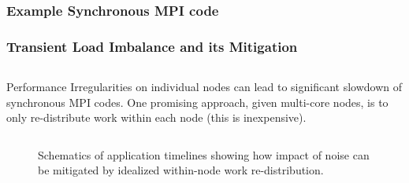 \begin{frame}
\frametitle{Example Synchronous MPI code}

\end{frame}


\begin{frame}
\frametitle{Transient Load Imbalance and its Mitigation}
\begin{columns} 
{\small Performance Irregularities on individual nodes can lead to
  significant slowdown of synchronous MPI codes. }
{\small One promising approach, given multi-core nodes, is to only
re-distribute work within each node (this is inexpensive). } 
\end{columns} 

\begin{figure}[ht]
  \label{fig:NoiseTransImbPic}
  \label{fig:AmplificationPic1}
  \label{fig:AmplificationPic3}\hspace*{0.25in}
  \caption{\label{fig:NoiseTransImbPic} Schematics of application
    timelines showing how impact of noise can be mitigated by
    idealized within-node work re-distribution.} 
\end{figure}
\end{frame}

